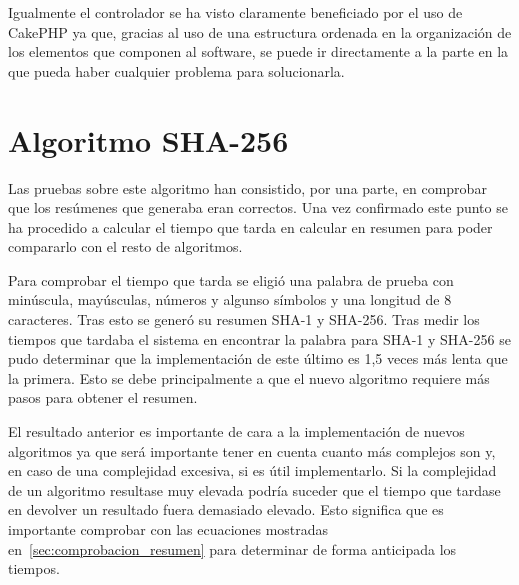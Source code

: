 Igualmente el controlador se ha visto claramente beneficiado por el uso de CakePHP ya que, gracias al uso de una estructura ordenada en la organización de los elementos que componen al software, se puede ir directamente a la parte en la que pueda haber cualquier problema para solucionarla.

\section{Algoritmo SHA-256}

Las pruebas sobre este algoritmo han consistido, por una parte, en comprobar que los resúmenes que generaba eran correctos. Una vez confirmado este punto se ha procedido a calcular el tiempo que tarda en calcular en resumen para poder compararlo con el resto de algoritmos.

Para comprobar el tiempo que tarda se eligió una palabra de prueba con minúscula, mayúsculas, números y algunso símbolos y una longitud de 8 caracteres. Tras esto se generó su resumen SHA-1 y SHA-256. Tras medir los tiempos que tardaba el sistema en encontrar la palabra para SHA-1 y SHA-256 se pudo determinar que la implementación de este último es 1,5 veces más lenta que la primera. Esto se debe principalmente a que el nuevo algoritmo requiere más pasos para obtener el resumen.

El resultado anterior es importante de cara a la implementación de nuevos algoritmos ya que será importante tener en cuenta cuanto más complejos son y, en caso de una complejidad excesiva, si es útil implementarlo. Si la complejidad de un algoritmo resultase muy elevada podría suceder que el tiempo que tardase en devolver un resultado fuera demasiado elevado. Esto significa que es importante comprobar con las ecuaciones mostradas en~\ref{sec:comprobacion_resumen} para determinar de forma anticipada los tiempos.